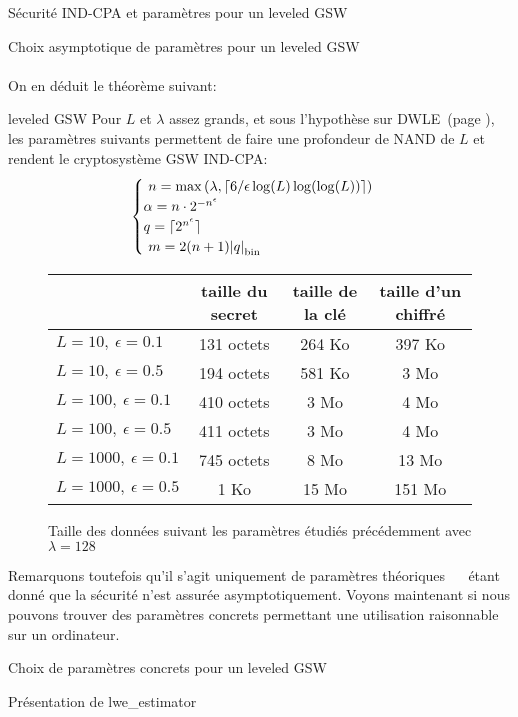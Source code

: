 \begin{section}{Sécurité IND-CPA et paramètres pour un leveled GSW}
\begin{subsection}{Choix asymptotique de paramètres pour un leveled GSW}
\paragraph{}
On en déduit le théorème suivant:
\begin{thm}{leveled GSW}
	Pour $L$ et $\lambda$ assez grands, et sous l'hypothèse sur DWLE~(page \pageref{hyp_dlwe}), les paramètres suivants permettent de faire une profondeur de NAND de $L$
et rendent le cryptosystème GSW IND-CPA:
\[ \begin{cases} 
	n = \max\left(\lambda, \lceil 6/\epsilon \log(L) \log(\log(L))
	\rceil\right)  \\
	\alpha  = n \cdot 2^{-n^\epsilon}  \\
	q = \lceil 2^{n^\epsilon} \rceil\\ 
	m = 2(n+1)\bnorm{q} \\  
	\end{cases}  \]
\end{thm}

\begin{figure}[!ht]
\begin{tabular}{|l|c|c|c|}
\hline
& taille du secret & taille de la clé & taille d'un chiffré \\
\hline
$L = 10, \ \epsilon = 0.1$ & 131 octets & 264 Ko & 397 Ko \\
\hline
$L = 10, \ \epsilon = 0.5$ & 194 octets & 581 Ko & 3 Mo \\
\hline
$L = 100, \ \epsilon = 0.1$ & 410 octets & 3 Mo & 4 Mo \\
\hline
$L = 100, \ \epsilon = 0.5$ & 411 octets & 3 Mo & 4 Mo \\
\hline
$L = 1000, \ \epsilon = 0.1$ & 745 octets & 8 Mo & 13 Mo \\
\hline
$L = 1000, \ \epsilon = 0.5$ & 1 Ko & 15 Mo & 151 Mo \\
\hline
\end{tabular}
\caption{Taille des données suivant les paramètres étudiés précédemment avec $\lambda = 128$}
\label{size_boostrapping}
\end{figure}

Remarquons toutefois qu'il s'agit uniquement de paramètres \og théoriques \fg~ \ étant donné que la sécurité n'est
assurée asymptotiquement. Voyons maintenant si nous pouvons trouver des paramètres concrets permettant une utilisation 
raisonnable sur un ordinateur.

\end{subsection}

\begin{subsection}{Choix de paramètres concrets pour un leveled GSW}
\begin{subsubsection}{Présentation de lwe\_estimator}
\label{estimator}
	

\end{subsubsection}
\end{subsection}
\end{section}
